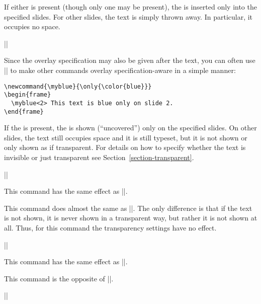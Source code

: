 \begin{command}{\only{}}
  If either  is present (though only one may be present), the  is inserted only into the specified slides. For other slides, the text is simply thrown away. In particular, it occupies no space.

  \example
  ||

  Since the overlay specification may also be given after the text, you can often use |\only| to make other commands overlay specification-aware in a simple manner:

  \example
\begin{verbatim}
\newcommand{\myblue}{\only{\color{blue}}}
\begin{frame}
  \myblue<2> This text is blue only on slide 2.
\end{frame}
\end{verbatim}
\end{command}

\begin{command}{\uncover{}}
  If the  is present, the  is shown (``uncovered'') only on the specified slides. On other slides, the text still occupies space and it is still typeset, but it is not shown or only shown as if transparent. For details on how to specify whether the text is invisible or just transparent see Section~\ref{section-transparent}.

  \example
  ||

  \articlenote
  This command has the same effect as |\only|.
\end{command}

\begin{command}{\visible{}}
  This command does almost the same as |\uncover|. The only difference is that if the text is not shown, it is never shown in a transparent way, but rather it is not shown at all. Thus, for this command the transparency settings have no effect.

  \example
  ||

  \articlenote
  This command has the same effect as |\only|.
\end{command}

\begin{command}{\invisible{}}
  This command is the opposite of |\visible|.

  \example
  ||
\end{command}

